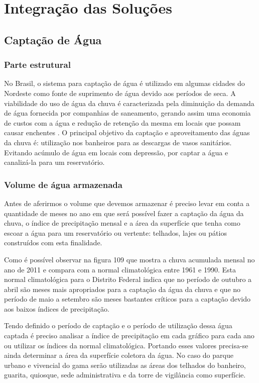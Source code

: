 \part{Integração das Soluções}

\chapter{Captação de Água}

\section{Parte estrutural}

No Brasil, o sistema para captação de água é utilizado em algumas cidades do Nordeste como fonte de suprimento de água devido aos períodos de seca. A viabilidade do uso de água da chuva é caracterizada pela diminuição da demanda de água fornecida por companhias de saneamento, gerando assim uma economia de custos com a água e redução de retenção da mesma em locais que possam causar enchentes \citep{MAY}.
O principal objetivo da captação e aproveitamento das águas da chuva é: utilização nos banheiros para as descargas de vasos sanitários. Evitando acúmulo de água em locais com depressão, por captar a água e canalizá-la para um reservatório.

\section{Volume de água armazenada}

Antes de aferirmos o volume que devemos armazenar é preciso levar em conta a quantidade de meses no ano em que será possível fazer a captação da água da chuva, o índice de precipitação mensal e a área da superfície que tenha como escoar a água para um reservatório ou vertente: telhados, lajes ou pátios construídos com esta finalidade. 

Como é possível observar na figura 109 que mostra a chuva acumulada mensal no ano de 2011 e compara com a normal climatológica entre 1961 e 1990. Esta normal climatológica para o Distrito Federal indica que no período de outubro a abril são meses mais apropriados para a captação da água da chuva e que no período de maio a setembro são meses bastantes críticos para a captação devido aos baixos índices de precipitação. 

Tendo definido o período de captação e o período de utilização dessa água captada é preciso analisar a índice de precipitação em cada gráfico para cada ano ou utilizar os índices da normal climatológica. Portando esses valores precisa-se ainda determinar a área da superfície coletora da água. No caso do parque urbano e vivencial do gama serão utilizadas as áreas dos telhados do banheiro, guarita, quiosque, sede administrativa e da torre de vigilância como superfície. 

